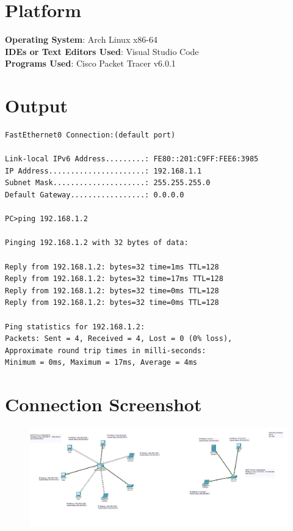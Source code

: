 \documentclass[11pt]{article}
\begin{document}
\section{Platform}
	\textbf{Operating System}: Arch Linux x86-64\\
	\textbf{IDEs or Text Editors Used}: Visual Studio Code\\
	\textbf{Programs Used}: Cisco Packet Tracer v6.0.1

\section{Output}

\begin{lstlisting}
FastEthernet0 Connection:(default port)

Link-local IPv6 Address.........: FE80::201:C9FF:FEE6:3985
IP Address......................: 192.168.1.1
Subnet Mask.....................: 255.255.255.0
Default Gateway.................: 0.0.0.0

PC>ping 192.168.1.2

Pinging 192.168.1.2 with 32 bytes of data:

Reply from 192.168.1.2: bytes=32 time=1ms TTL=128
Reply from 192.168.1.2: bytes=32 time=17ms TTL=128
Reply from 192.168.1.2: bytes=32 time=0ms TTL=128
Reply from 192.168.1.2: bytes=32 time=0ms TTL=128

Ping statistics for 192.168.1.2:
Packets: Sent = 4, Received = 4, Lost = 0 (0% loss),
Approximate round trip times in milli-seconds:
Minimum = 0ms, Maximum = 17ms, Average = 4ms

\end{lstlisting}

\section{Connection Screenshot}


\begin{figure}[H]
	\centering
	\includegraphics[scale=0.47]{Screenshots/Assignment_2_screenshot.png}
\end{figure}
\end{document}
